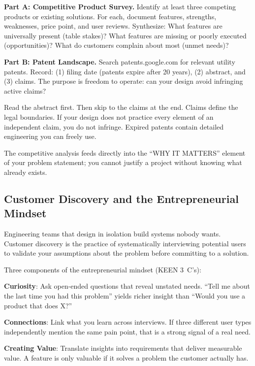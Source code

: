 \documentclass[11pt,letterpaper,twoside,openany]{book}
\begin{document}
\textbf{Part A: Competitive Product Survey.} Identify at least three competing products or existing solutions. For each, document features, strengths, weaknesses, price point, and user reviews. Synthesize: What features are universally present (table stakes)? What features are missing or poorly executed (opportunities)? What do customers complain about most (unmet needs)?

\textbf{Part B: Patent Landscape.} Search patents.google.com for relevant utility patents. Record: (1) filing date (patents expire after 20 years), (2) abstract, and (3) claims. The purpose is freedom to operate: can your design avoid infringing active claims?

\begin{tipbox}
Read the abstract first. Then skip to the claims at the end. Claims define the legal boundaries. If your design does not practice every element of an independent claim, you do not infringe. Expired patents contain detailed engineering you can freely use.
\end{tipbox}

The competitive analysis feeds directly into the ``WHY IT MATTERS'' element of your problem statement; you cannot justify a project without knowing what already exists.

\subsection{Customer Discovery and the Entrepreneurial Mindset}
Engineering teams that design in isolation build systems nobody wants. Customer discovery is the practice of systematically interviewing potential users to validate your assumptions about the problem before committing to a solution.

Three components of the entrepreneurial mindset (KEEN 3~C's):

\textbf{Curiosity}: Ask open-ended questions that reveal unstated needs. ``Tell me about the last time you had this problem'' yields richer insight than ``Would you use a product that does X?''

\textbf{Connections}: Link what you learn across interviews. If three different user types independently mention the same pain point, that is a strong signal of a real need.

\textbf{Creating Value}: Translate insights into requirements that deliver measurable value. A feature is only valuable if it solves a problem the customer actually has.
\end{document}
